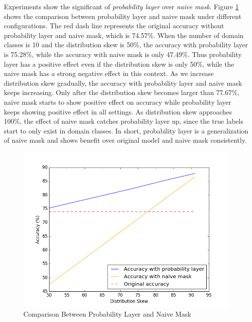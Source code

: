 \documentclass[pageno]{jpaper}
\begin{document}
Experiments show the significant of \textit{probability layer} over \textit{naive mask}. Figure \ref{fig:NaiveMask} shows the comparison between probability layer and naive mask under different configurations. The red dash line represents the original accuracy without probability layer and naive mask, which is 74.57\%. When the number of domain classes is 10 and the distribution skew is 50\%, the accuracy with probability layer is 75.28\%, while the accuracy with naive mask is only 47.49\%. Thus probability layer has a positive effect even if the distribution skew is only 50\%, while the naive mask has a strong negative effect in this context. As we increase distribution skew gradually, the accuracy with probability layer and naive mask keeps increasing. Only after the distribution skew becomes larger than 77.67\%, naive mask starts to show positive effect on accuracy while probability layer keeps showing positive effect in all settings. As distribution skew approaches 100\%, the effect of naive mask catches probability layer up, since the true labels start to only exist in domain classes. In short, probability layer is a generalization of naive mask and shows benefit over original model and naive mask consistently.

\begin{figure}
\includegraphics[scale=0.43]{figure_1-1.png}
\caption{Comparison Between Probability Layer and Naive Mask}
\label{fig:NaiveMask}
\end{figure}
\end{document}
